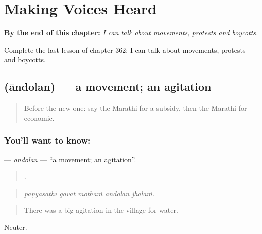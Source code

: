 
\chapter{Making Voices Heard}
\label{ch:mr-making-voices-heard}

\begin{chapteropening}
\textbf{By the end of this chapter:} \emph{I can talk about movements, protests and boycotts.}

Complete the last lesson of chapter 362: I can talk about movements, protests and boycotts.
\end{chapteropening}

\section[\texorpdfstring{\mr{आंदोलन} (āndolan)}{आंदोलन (āndolan)}]{ (āndolan) — a movement; an agitation}

\label{lesson:MR-C362-andolan}



\begin{quote}
Before the new one: say the Marathi for a subsidy, then the Marathi for economic.
\end{quote}

\subsection*{You'll want to know: }
\textbf{} — \emph{āndolan} — \textquotedblleft{}a movement; an agitation\textquotedblright{}.

\begin{quote}
    .
\end{quote}

\begin{quote}
\emph{pāṇyāsāṭhī gāvāt moṭhaṁ āndolan jhālaṁ.}
\end{quote}

\begin{quote}
There was a big agitation in the village for water.
\end{quote}

Neuter.

